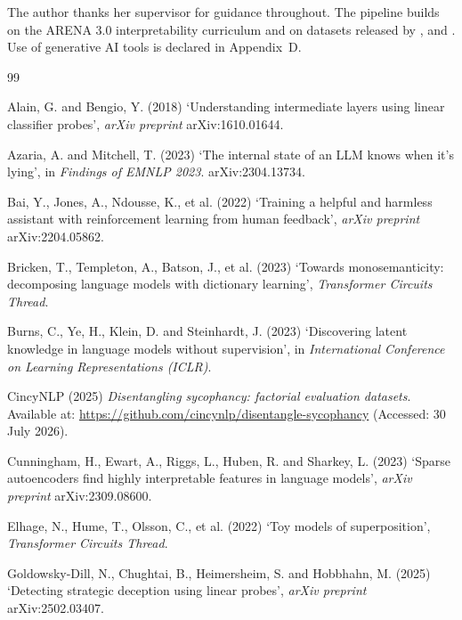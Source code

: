 \documentclass[conference]{IEEEtran}
\begin{document}
The author thanks her supervisor for guidance throughout. The pipeline builds on
the ARENA 3.0 interpretability curriculum \citep{arena2024} and on datasets
released by \citet{goldowsky2025}, \citet{mckenzie2025} and \citet{cincynlp2025}.
Use of generative AI tools is declared in Appendix~D.

\begin{thebibliography}{99}
\setlength{\itemsep}{2pt}

Alain, G. and Bengio, Y. (2018) `Understanding intermediate layers using linear
classifier probes', \textit{arXiv preprint} arXiv:1610.01644.

Azaria, A. and Mitchell, T. (2023) `The internal state of an LLM knows when it's
lying', in \textit{Findings of EMNLP 2023}. arXiv:2304.13734.

Bai, Y., Jones, A., Ndousse, K., et al. (2022) `Training a helpful and harmless
assistant with reinforcement learning from human feedback', \textit{arXiv
preprint} arXiv:2204.05862.

Bricken, T., Templeton, A., Batson, J., et al. (2023) `Towards monosemanticity:
decomposing language models with dictionary learning',
\textit{Transformer Circuits Thread}.

Burns, C., Ye, H., Klein, D. and Steinhardt, J. (2023) `Discovering latent
knowledge in language models without supervision', in \textit{International
Conference on Learning Representations (ICLR)}.

CincyNLP (2025) \textit{Disentangling sycophancy: factorial evaluation
datasets}. Available at: \url{https://github.com/cincynlp/disentangle-sycophancy}
(Accessed: 30 July 2026).

Cunningham, H., Ewart, A., Riggs, L., Huben, R. and Sharkey, L. (2023) `Sparse
autoencoders find highly interpretable features in language models',
\textit{arXiv preprint} arXiv:2309.08600.

Elhage, N., Hume, T., Olsson, C., et al. (2022) `Toy models of superposition',
\textit{Transformer Circuits Thread}.

Goldowsky-Dill, N., Chughtai, B., Heimersheim, S. and Hobbhahn, M. (2025)
`Detecting strategic deception using linear probes', \textit{arXiv preprint}
arXiv:2502.03407.


\end{thebibliography}
\end{document}
